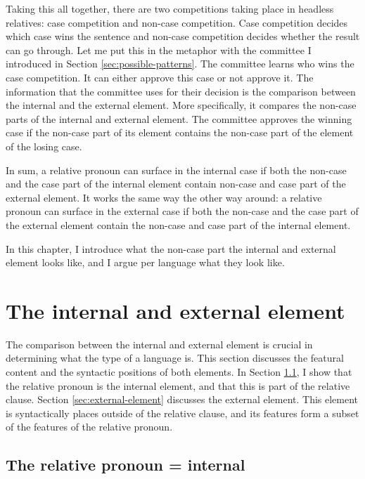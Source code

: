 Taking this all together, there are two competitions taking place in headless relatives: case competition and non-case competition. Case competition decides which case wins the sentence and non-case competition decides whether the result can go through. Let me put this in the metaphor with the committee I introduced in Section \ref{sec:possible-patterns}. The committee learns who wins the case competition. It can either approve this case or not approve it. The information that the committee uses for their decision is the comparison between the internal and the external element. More specifically, it compares the non-case parts of the internal and external element. The committee approves the winning case if the non-case part of its element contains the non-case part of the element of the losing case.

In sum, a relative pronoun can surface in the internal case if both the non-case and the case part of the internal element contain non-case and case part of the external element. It works the same way the other way around: a relative pronoun can surface in the external case if both the non-case and the case part of the external element contain the non-case and case part of the internal element.

In this chapter, I introduce what the non-case part the internal and external element looks like, and I argue per language what they look like.


\section{The internal and external element}\label{sec:int-ext-elements}

The comparison between the internal and external element is crucial in determining what the type of a language is. This section discusses the featural content and the syntactic positions of both elements. In Section \ref{sec:internal-element}, I show that the relative pronoun is the internal element, and that this is part of the relative clause. Section \ref{sec:external-element} discusses the external element. This element is syntactically places outside of the relative clause, and its features form a subset of the features of the relative pronoun.

\subsection{The relative pronoun = internal}\label{sec:internal-element}

